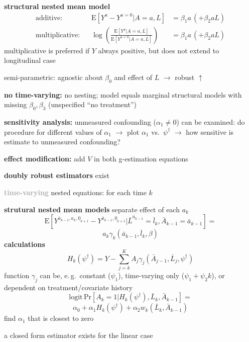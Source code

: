 \documentclass[8pt,twoside]{extarticle}
\begin{document}
\begin{multicols}{2}
 \textbf{structural nested mean model}
\begin{align*}
\text{additive: }\,\,\, & \mathrm{E}\left[Y^a-Y^{a=0}|A=a, L\right] &= \beta_1 a \,(+ \beta_2 a L) \\
\text{multiplicative: }\,\,\, & \log \left( \frac{\mathrm{E}\left[Y^a|A=a, L\right]}{\mathrm{E}\left[Y^{a=0}|A=a, L\right]} \right) &= \beta_1 a \,(+ \beta_2 a L)
\end{align*} 
multiplicative is preferred if $Y$ always positive, but does not extend to longitudinal case

 semi-parametric: agnostic about $\beta_0$ and effect of $L$ $\rightarrow$ robust $\uparrow$

 \textbf{no time-varying:} no nesting; model equals marginal structural models with missing $\beta_0, \beta_3$ (unspecified ``no treatment'')

 \textbf{sensitivity analysis:} unmeasured confounding ($\alpha_1 \neq 0$) can be examined: do procedure  for different values of $\alpha_1$ $\rightarrow$ plot $\alpha_1$ vs.\ $\psi^\dagger$ $\rightarrow$ how sensitive is  estimate to unmeasured confounding?

 \textbf{effect modification:} add $V$ in both g-estimation equations %


 \textbf{doubly robust estimators} exist%

\vspace{0.2em}
 \colorbox{lightgray!20!white}{\begin{minipage}{28em}
\textbf{\textcolor{darkgray}{time-varying}}
 nested equations: for each time $k$

 \textbf{strutural nested mean models} separate effect of each $a_k$
$$\mathrm{E}\left[Y^{\bar{a}_{k-1}, a_k, \underline{0}_{k+1}} - Y^{\bar{a}_{k-1}, \underline{0}_{k+1}}|\bar{L}^{\bar{a}_{k-1}}=\bar{l}_k, \bar{A}_{k-1} = \bar{a}_{k-1}\right] = $$
$$  a_k\gamma_k\left(\bar{a}_{k-1}, \bar{l}_k,\beta\right)$$
 \textbf{calculations}
$$H_k\left(\psi^\dagger\right) = Y - \sum_{j=k}^K A_j \gamma_j\left(\bar{A}_{j-1}, \bar{L}_j, \psi^\dagger\right)$$
 function $\gamma_j$ can be, e.\,g.\ constant ($\psi_1$), time-varying only ($\psi_1+\psi_2k$), or dependent on treatment/covariate history
$$\mathrm{logit}\,\mathrm{Pr}\left[A_k=1|H_k\left(\psi^\dagger\right), \bar{L}_k,\bar{A}_{k-1}\right]=$$
$$\alpha_0 +\alpha_1H_k\left(\psi^\dagger\right)+\alpha_2 w_k\left(\bar{L}_k,\bar{A}_{k-1}\right)
$$
find $\alpha_1$ that is closest to zero

a closed form estimator exists for the linear case

\end{minipage}}

























\end{multicols}
\end{document}
